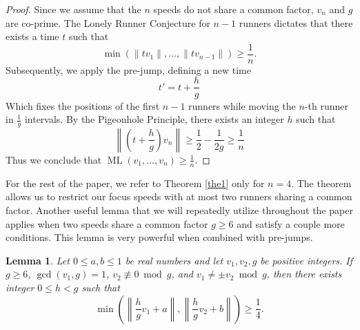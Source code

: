 \documentclass[11pt]{amsart}
\newtheorem{lemma}{Lemma}[section]
\DeclareMathOperator{\ML}{ML}
\begin{document}
\begin{proof}
    Since we assume that the $n$ speeds do not share a common factor, $v_{n}$ and $g$ are co-prime. The Lonely Runner Conjecture for $n-1$ runners dictates that there exists a time $t$ such that
    $$\min(\|tv_1\|,\ldots,\|tv_{n-1}\|) \geq \frac{1}{n}.$$
    Subsequently, we apply the pre-jump, defining a new time
    $$t' = t + \frac{h}{g}$$
    Which fixes the positions of the first $n-1$ runners while moving the $n$-th runner in $\frac{1}{g}$ intervals. By the Pigeonhole Principle, there exists an integer $h$ such that
    $$\left\lVert\left(t + \frac{h}{g}\right)v_n\right\rVert \geq \frac{1}{2} - \frac{1}{2g} \geq \frac{1}{n}$$
    Thus we conclude that $\ML(v_1,\ldots,v_n) \geq \frac{1}{n}$.
\end{proof}

For the rest of the paper, we refer to Theorem \ref{the1} only for $n = 4$. The theorem allows us to restrict our focus speeds with at most two runners sharing a common factor. Another useful lemma that we will repeatedly utilize throughout the paper applies when two speeds share a common factor $g \geq 6$ and satisfy a couple more conditions. This lemma is very powerful when combined with pre-jumps.
\begin{lemma}
    \label{lem2}
    Let $0\le a,b\le 1$ be real numbers and let $v_1,v_2,g$ be positive integers. If $g \geq 6$, $\gcd(v_1,g) = 1$, $v_2 \not\equiv 0 \bmod g$, and $v_1 \neq \pm v_2 \bmod g$, then there exists integer $0 \leq h < g$ such that
    $$\min\left(\left\lVert\frac{h}{g}v_1 + a\right\rVert,\left\lVert\frac{h}{g}v_2 + b\right\rVert\right) \geq \frac{1}{4}.$$
\end{lemma}
\end{document}
